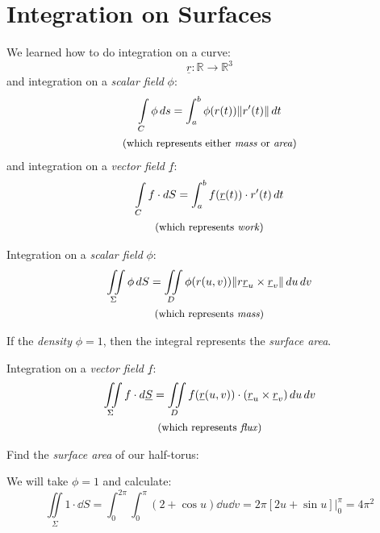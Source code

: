\documentclass[00_complete]{subfiles}
\begin{document}
\section{Integration on Surfaces}
\begin{reminder}
    We learned how to do integration on a curve:
    $$\underline r: \mathbb{R} \to \mathbb{R}^3$$
    and integration on a \emph{scalar field} $\phi$:
    \begin{gather*}
    \int\limits_C\phi\dd{s}=\int_{a}^{b}\phi(r(t))\|r'(t)\|\dd{t} \\
    \text{\small (which represents either \emph{mass} or \emph{area})}
    \end{gather*}
    and integration on a \emph{vector field} $\underline f$:
    \begin{gather*}
    \int\limits_Cf\cdot \dd{S}=\int_{a}^{b}f(\underline r(t))\cdot r'(t)\dd{t}
    \\
    \text{\small (which represents \emph{work})}
    \end{gather*}
\end{reminder}
Integration on a \emph{scalar field} $\phi$:
\begin{gather*}
\iint\limits_\Sigma \phi \dd{S} = \iint\limits_D \phi(r(u,v))\|r\underline
r_u \times \underline r_v\|\dd{u}\dd{v} \\
\text{\small (which represents \emph{mass})}
\end{gather*}
\begin{note}
    If the \emph{density} $\phi=1$, then the integral represents the
    \emph{surface area}.
\end{note}
Integration on a \emph{vector field} $\underline f$:
\begin{gather*}
\iint\limits_\Sigma f \cdot \dd{\underline S} = \iint\limits_D f(\underline
r(u,v))\cdot (\underline r_u \times \underline r_v)\dd{u}\dd{v} \\
\text{\small (which represents \emph{flux})}
\end{gather*}
\begin{example}
    Find the \emph{surface area} of our half-torus:

    We will take $\phi=1$ and calculate:
    $$\iint\limits_\Sigma 1 \cdot \dd{S}=\int_{0}^{2\pi}\int_{0}^{\pi}(2+\cos
    u)\dd{u}\dd{v}=2\pi[2u+\sin u]\Bigr|_0^\pi=4\pi^2$$
\end{example}
\end{document}
